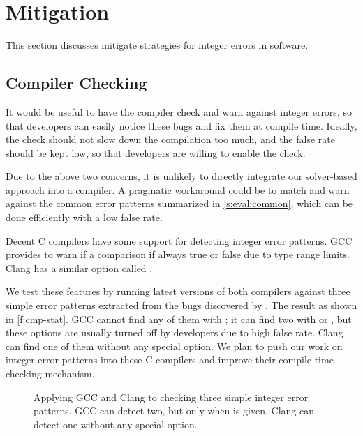 \section{Mitigation}
\label{s:miti}

This section discusses mitigate strategies for integer errors in
software.

\subsection{Compiler Checking}

It would be useful to have the compiler check and warn against
integer errors, so that developers can easily notice these bugs and
fix them at compile time.  Ideally, the check should not slow down
the compilation too much, and the false rate should be kept low,
so that developers are willing to enable the check.

Due to the above two concerns, it is unlikely to directly integrate
our solver-based approach into a compiler.  A pragmatic workaround
could be to match and warn against the common error patterns
summarized in \autoref{s:eval:common}, which can be done efficiently
with a low false rate.

Decent C compilers have some support for detecting integer error
patterns.
%
GCC provides  to warn if a comparison if always
true or false due to type range limits.
%
Clang has a similar option called .

We test these features by running latest versions of both compilers
against three simple error patterns extracted from the bugs discovered
by \sys.  The result as shown in \autoref{f:cmp-stat}.  GCC cannot
find any of them with ; it can find two with 
or , but these options are usually turned off by
developers due to high false rate.  Clang can find one of them
without any special option.
%
%
We plan to push our work on integer error patterns into these C
compilers and improve their compile-time checking mechanism.

\begin{figure}
\centering

\caption{Applying GCC and Clang to checking three simple integer
error patterns.  GCC can detect two, but only when  is
given.  Clang can detect one without any special option.}
\label{f:cmp-stat}
\end{figure}

